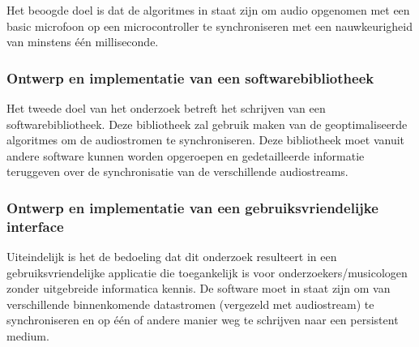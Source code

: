 Het beoogde doel is dat de algoritmes in staat zijn om audio opgenomen met een basic microfoon op een microcontroller te synchroniseren met een nauwkeurigheid van minstens één milliseconde.

\subsubsection{Ontwerp en implementatie van een softwarebibliotheek}
Het tweede doel van het onderzoek betreft het schrijven van een softwarebibliotheek. Deze bibliotheek zal gebruik maken van de geoptimaliseerde algoritmes om de audiostromen te synchroniseren. Deze bibliotheek moet vanuit andere software kunnen worden opgeroepen en gedetailleerde informatie teruggeven over de synchronisatie van de verschillende audiostreams.

\subsubsection{Ontwerp en implementatie van een gebruiksvriendelijke interface}
\label{target-ui}

Uiteindelijk is het de bedoeling dat dit onderzoek resulteert in een gebruiksvriendelijke applicatie die toegankelijk is voor onderzoekers/musicologen zonder uitgebreide informatica kennis. De software moet in staat zijn om van verschillende binnenkomende datastromen (vergezeld met audiostream) te synchroniseren en op één of andere manier weg te schrijven naar een persistent medium.
